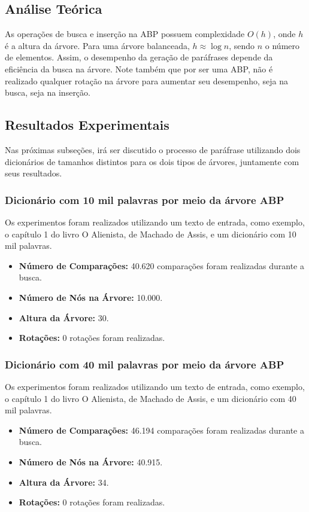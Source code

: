 \documentclass[a4paper, 12pt, english]{article}
\begin{document}
\subsection{Análise Teórica}
As operações de busca e inserção na ABP possuem complexidade $O(h)$, onde $h$ é a altura da árvore. Para uma árvore balanceada, $h \approx \log n$, sendo $n$ o número de elementos. Assim, o desempenho da geração de paráfrases depende da eficiência da busca na árvore. Note também que por ser uma ABP, não é realizado qualquer rotação na árvore para aumentar seu desempenho, seja na busca, seja na inserção.

\subsection{Resultados Experimentais}
Nas próximas subseções, irá ser discutido o processo de paráfrase utilizando dois dicionários de tamanhos distintos para os dois tipos de árvores, juntamente com seus resultados.

\subsubsection{Dicionário com 10 mil palavras por meio da árvore ABP}

Os experimentos foram realizados utilizando um texto de entrada, como exemplo, o capítulo 1 do livro O Alienista, de Machado de Assis, e um dicionário com 10 mil palavras.

\begin{itemize}
    \item \textbf{Número de Comparações:} 40.620 comparações foram realizadas durante a busca.
    \item \textbf{Número de Nós na Árvore:} 10.000.
    \item \textbf{Altura da Árvore:} 30.
    \item \textbf{Rotações:} 0 rotações foram realizadas.
\end{itemize}

\subsubsection{Dicionário com 40 mil palavras por meio da árvore ABP}

Os experimentos foram realizados utilizando um texto de entrada, como exemplo, o capítulo 1 do livro O Alienista, de Machado de Assis, e um dicionário com 40 mil palavras.

\begin{itemize}
    \item \textbf{Número de Comparações:} 46.194 comparações foram realizadas durante a busca.
    \item \textbf{Número de Nós na Árvore:} 40.915.
    \item \textbf{Altura da Árvore:} 34.
    \item \textbf{Rotações:} 0 rotações foram realizadas.
\end{itemize}
\end{document}
